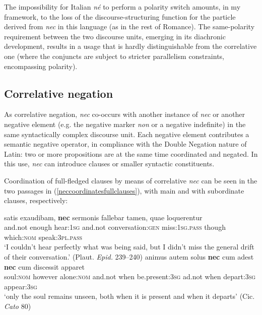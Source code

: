 \documentclass[output=paper]{langsci/langscibook}
\begin{document}
\noindent The impossibility for Italian {\emph{n\'e}} to perform a polarity switch amounts, in my framework, to the loss of the discourse-structuring function for the particle derived from {\emph{nec}} in this language (as in the rest of Romance). The same-polarity requirement between the two discourse units, emerging in its diachronic development, results in a usage that is hardly distinguishable from the correlative one (where the conjuncts are subject to stricter parallelism constraints, encompassing polarity).

\subsection{Correlative negation} \label{functioncorrelativeneg}

As correlative negation, {\emph{nec}} co-occurs with another instance of {\emph{nec}} or another negative element (e.g. the negative marker {\emph{non}} or a negative indefinite) in the same syntactically complex discourse unit. Each negative element contributes a semantic negative operator, in compliance with the Double Negation nature of Latin: two or more propositions are at the same time coordinated and negated. In this use, {\emph{nec}} can introduce clauses or smaller syntactic constituents.

Coordination of full-fledged clauses by means of correlative {\emph{nec}} can be seen in the two passages in (\ref{neccoordinatesfullclauses}), with main and with subordinate clauses, respectively:

\begin{exe}
\ex \label{neccoordinatesfullclauses}
\begin{xlist}
\ex {} satis exaudibam, {\textbf{nec}} sermonis fallebar tamen, quae loquerentur\\
and.not enough hear:{\textsc{1sg}} and.not conversation:{\textsc{gen}} miss:{\textsc{1sg.pass}} though which:{\textsc{nom}} speak:{\textsc{3pl.pass}} \\
\glt `I couldn't hear perfectly what was being said, but I didn't miss the general drift of their conversation.' (Plaut. {\emph{Epid.}} 239--240)
\ex \gll animus autem solus {\textbf{nec}} cum adest {\textbf{nec}} cum discessit apparet\\
soul:{\textsc{nom}} however alone:{\textsc{nom}} and.not when be.present:{\textsc{3sg}} ad.not when depart:{\textsc{3sg}} appear:{\textsc{3sg}}\\
\glt `only the soul remains unseen, both when it is present and when it departs' (Cic. {\emph{Cato}} 80)
\end{xlist}
\end{exe}
\end{document}
